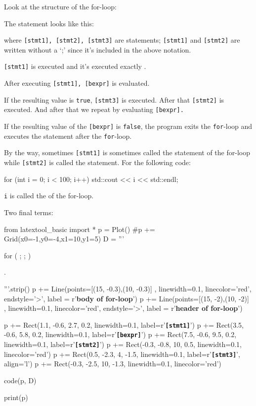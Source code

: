 Look at the structure of the for-loop:

The statement looks like this:
\begin{center}
\tab[1em]{\EMPHASIZE{\texttt{[stmt3]}}}
\end{center}
where \texttt{[stmt1], [stmt2], [stmt3]} are statements; \texttt{[stmt1]} and \texttt{[stmt2]} are written without a `;' since it's included in the above notation.

\texttt{[stmt1]} is executed  and it's executed exactly .

After executing \texttt{[stmt1], [bexpr]} is evaluated.

If the resulting value is \texttt{true}, \texttt{[stmt3]} is executed.
After that \texttt{[stmt2]} is executed. And after that we repeat by
evaluating \texttt{[bexpr].}

If the resulting value of the \texttt{[bexpr]} is \texttt{false}, the
program exits the \texttt{for}-loop and executes the statement after the
\texttt{for}-loop.

By the way, sometimes \texttt{[stmt1]} is sometimes called the  statement of the for-loop while \texttt{[stmt2]} is called the  statement. For the following code:
\begin{console}
for (int i = 0; i < 100; i++)
{   
    std::cout << i << std::endl;
}
\end{console}
\texttt{i} is called the  of the
for-loop.

Two final terms:
\begin{python}
from latextool_basic import *
p = Plot()
#p += Grid(x0=-1,y0=-4,x1=10,y1=5)
D = '''





for (         ;              ;                )




               .






'''.strip()
p += Line(points=[(15, -0.3),(10, -0.3)] , linewidth=0.1, linecolor='red', endstyle='>', label = r'\textbf{body of for-loop}')
p += Line(points=[(15, -2),(10, -2)] , linewidth=0.1, linecolor='red', endstyle='>', label = r'\textbf{header of for-loop}')

p += Rect(1.1, -0.6, 2.7, 0.2, linewidth=0.1, label=r'\texttt{\textbf{[stmt1]}}')
p += Rect(3.5, -0.6, 5.8, 0.2, linewidth=0.1, label=r'\texttt{\textbf{[bexpr]}}')
p += Rect(7.5, -0.6, 9.5, 0.2, linewidth=0.1, label=r'\texttt{\textbf{[stmt2]}}')
p += Rect(-0.3, -0.8, 10, 0.5, linewidth=0.1, linecolor='red')
p += Rect(0.5, -2.3, 4, -1.5, linewidth=0.1, label=r'\texttt{\textbf{[stmt3]}}', align='l')
p += Rect(-0.3, -2.5, 10, -1.3, linewidth=0.1, linecolor='red')

code(p, D)

print(p)
\end{python}

